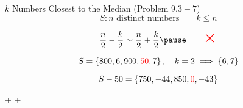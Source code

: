 \begin{frame}{}
  \begin{exampleblock}{$k$ Numbers Closest to the Median (Problem $9.3-7$)}
    \[
      S: n \text{ distinct numbers} \qquad k \le n
    \]
  \end{exampleblock}

  \pause
  \[
    \frac{n}{2} - \frac{k}{2} \sim \frac{n}{2} + \frac{k}{2} \pause \qquad \scalebox{2}{\red{$\times$}}
  \]

  \pause
  \[
    S = \left\{800, 6, 900, \textcolor{red}{50}, 7\right\}, \quad k = 2 \implies \left\{6,7\right\}
  \]

  \pause
  \[
    S - 50 = \left\{750, -44, 850, \textcolor{red}{0}, -43\right\}
  \]

  \pause
  \vspace{0.50cm}
  \centerline{ +  + }
\end{frame}
